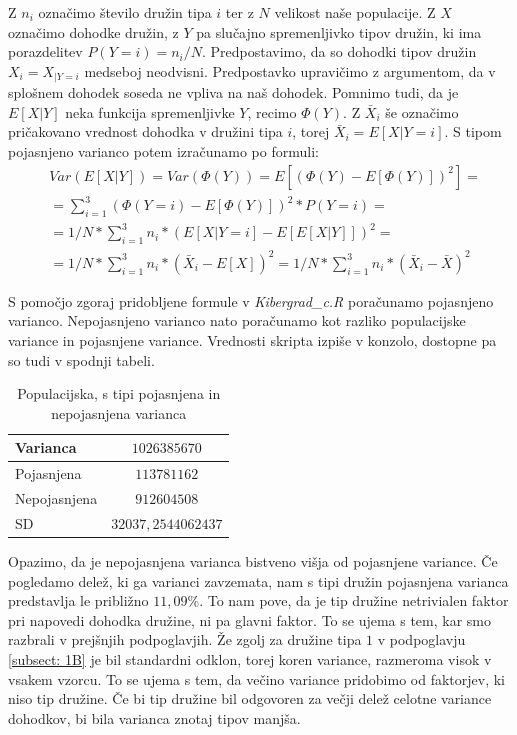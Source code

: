 \documentclass[a4paper, 10pt]{article}
\begin{document}
	Z $n_i$ označimo število družin tipa $i$ ter z $N$ velikost naše populacije. Z $X$ označimo dohodke družin, z $Y$ pa  slučajno spremenljivko tipov družin, ki ima porazdelitev $P(Y = i) = n_i / N$. Predpostavimo, da so dohodki tipov družin $X_i = X_{|Y=i}$ medseboj neodvisni. Predpostavko upravičimo z argumentom, da v splošnem dohodek soseda ne vpliva na naš dohodek. Pomnimo tudi, da je $E\left[X|Y\right]$ neka funkcija spremenljivke $Y$, recimo $\Phi(Y)$.
	Z $\bar{X}_i$ še označimo pričakovano vrednost dohodka v družini tipa $i$, torej $\bar{X}_i = E\left[X|Y = i\right]$. S tipom pojasnjeno varianco potem izračunamo po formuli: 
	\begin{equation*} \label{eq: explvarC} \begin{split}
			& Var(E\left[X|Y\right]) = Var(\Phi(Y)) = E\left[(\Phi(Y)- E\left[\Phi(Y)\right])^2\right] =\\ 
			&= \sum_{i = 1}^{3} (\Phi(Y = i)- E\left[\Phi(Y)\right])^2 * P(Y = i) = \\ &= 1/N * \sum_{i = 1}^{3} n_i * (E\left[X|Y = i\right] - E\left[E\left[X|Y\right]\right])^2 = \\ &= 1/N * \sum_{i = 1}^{3} n_i * (\bar{X}_i - E\left[X\right])^2 = 1/N * \sum_{i = 1}^{3} n_i * (\bar{X}_i - \bar{X})^2
		\end{split}
	\end{equation*}

	S pomočjo zgoraj pridobljene formule v \textit{Kibergrad\_c.R} poračunamo pojasnjeno varianco. Nepojasnjeno varianco nato poračunamo kot razliko populacijske variance in pojasnjene variance. Vrednosti skripta izpiše v konzolo, dostopne pa so tudi v spodnji tabeli.
	
	\begin{table}[h!]
		\label{tab: varC}
		\centering
		\begin{tabular}{|l|c|}
			\hline
			Varianca & $1026385670$ \\ \hline
			Pojasnjena & $113781162$ \\ \hline
			Nepojasnjena & $912604508$ \\ \hline
			SD & $32037{,}2544062437$ \\ \hline
		\end{tabular}
		\caption{Populacijska, s tipi pojasnjena in nepojasnjena varianca}
	\end{table}
	
	Opazimo, da je nepojasnjena varianca bistveno višja od pojasnjene variance. Če pogledamo delež, ki ga varianci zavzemata, nam s tipi družin pojasnjena varianca predstavlja le približno $11{,}09\%$. To nam pove, da je tip družine netrivialen faktor pri napovedi dohodka družine, ni pa glavni faktor. To se ujema s tem, kar smo razbrali v prejšnjih podpoglavjih. Že zgolj za družine tipa $1$ v podpoglavju \ref{subsect: 1B} je bil standardni odklon, torej koren variance, razmeroma visok v vsakem vzorcu. To se ujema s tem, da večino variance pridobimo od faktorjev, ki niso tip družine. Če bi tip družine bil odgovoren za večji delež celotne variance dohodkov, bi bila varianca znotaj tipov manjša.
	
\end{document}
